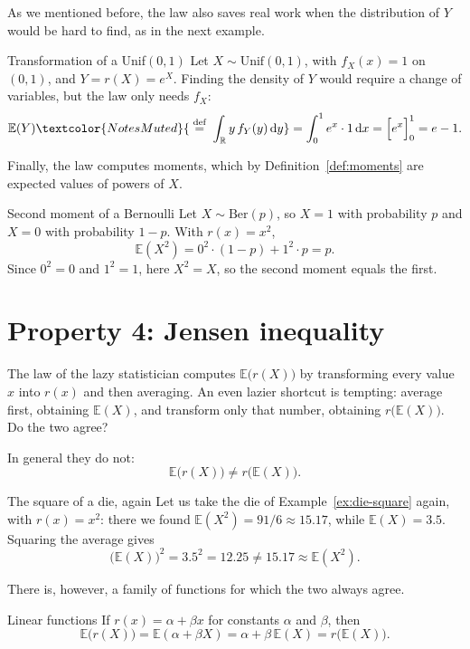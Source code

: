 \documentclass[a4paper,12pt,oneside]{report}
\begin{document}
As we mentioned before, the law also saves real work when the distribution
of $Y$ would be hard to find, as in the next example.

\begin{framedexample}{Transformation of a Unif$(0,1)$}
Let $X\sim\mathrm{Unif}(0,1)$, with $f_X(x)=1$ on $(0,1)$, and $Y=r(X)=e^X$.
Finding the density of $Y$ would require a change of variables, but the law
only needs $f_X$:
\[
\mathbb{E}(Y)\textcolor{NotesMuted}{\;\overset{\text{def}}{=}\;\int_{\mathbb{R}} y\,f_Y(y)\,\mathrm{d}y}=\int_0^1 e^x\cdot1\,\mathrm{d}x=\Big[e^x\Big]_0^1=e-1 .
\]
\end{framedexample}

Finally, the law computes moments, which by Definition~\ref{def:moments}
are expected values of powers of $X$.

\begin{framedexample}{Second moment of a Bernoulli}\label{ex:bernoulli-second-moment}
Let $X\sim\mathrm{Ber}(p)$, so $X=1$ with probability $p$ and $X=0$ with
probability $1-p$. With $r(x)=x^2$,
\[
\mathbb{E}(X^2)=0^2\cdot(1-p)+1^2\cdot p=p .
\]
Since $0^2=0$ and $1^2=1$, here $X^2=X$, so the second moment equals the
first.
\end{framedexample}

\section{Property 4: Jensen inequality}

The law of the lazy statistician computes $\mathbb{E}\big(r(X)\big)$ by
transforming every value $x$ into $r(x)$ and then averaging. An even lazier
shortcut is tempting: average first, obtaining $\mathbb{E}(X)$, and transform
only that number, obtaining $r\big(\mathbb{E}(X)\big)$. Do the two agree?

In general they do not:
\[
\mathbb{E}\big(r(X)\big)\neq r\big(\mathbb{E}(X)\big).
\]

\begin{framedexample}{The square of a die, again}
Let us take the die of Example~\ref{ex:die-square} again, with
$r(x)=x^2$: there we found $\mathbb{E}(X^2)=91/6\approx15.17$, while
$\mathbb{E}(X)=3.5$. Squaring the average gives
\[
\big(\mathbb{E}(X)\big)^2=3.5^2=12.25\neq15.17\approx\mathbb{E}(X^2).
\]
\end{framedexample}

There is, however, a family of functions for which the two always agree.

\begin{framedprop}{Linear functions}\label{prop:linear}
If $r(x)=\alpha+\beta x$ for constants $\alpha$ and $\beta$, then
\[
\mathbb{E}\big(r(X)\big)=\mathbb{E}(\alpha+\beta X)=\alpha+\beta\,\mathbb{E}(X)
=r\big(\mathbb{E}(X)\big).
\]
\end{framedprop}
\end{document}
